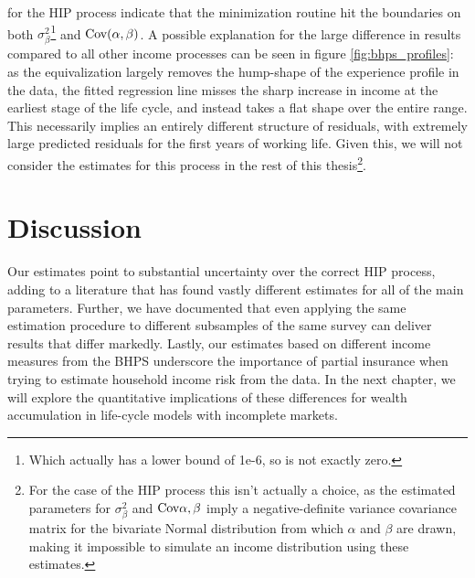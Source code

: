 for the HIP process indicate that the minimization routine hit the boundaries 
on both $\sigma^2_{\beta}$\footnote{Which actually has a lower bound of 1e-6, so 
is not exactly zero.} and $\mbox{Cov}(\alpha,\beta)$. A possible explanation for the 
large difference in results compared to all other income processes can be seen 
in figure \ref{fig:bhps_profiles}: as the equivalization largely removes the
hump-shape of the experience profile in the data, the fitted regression line
misses the sharp increase in income at the earliest stage of the life cycle, and
instead takes a flat shape over the entire range. This necessarily implies an
entirely different structure of residuals, with extremely large predicted residuals
for the first years of working life. Given this, we will not consider the estimates
for this process in the rest of this thesis\footnote{For the case of the HIP process 
this isn't actually a choice, as the estimated parameters for $\sigma^2_{\beta}$ and
$\mbox{Cov}{\alpha,\beta}$ imply a negative-definite variance covariance matrix for the
bivariate Normal distribution from which $\alpha$ and $\beta$ are drawn, making it
impossible to simulate an income distribution using these estimates.}.

\section{Discussion}
Our estimates point to substantial uncertainty over the correct HIP process, 
adding to a literature that has found vastly different estimates for all of the 
main parameters. Further, we have documented that even applying the same estimation
procedure to different subsamples of the same survey can deliver results that
differ markedly. Lastly, our estimates based on different income measures from 
the BHPS underscore the importance of partial insurance when trying to estimate
household income risk from the data. In the next chapter, we will explore the
quantitative implications of these differences for wealth accumulation in 
life-cycle models with incomplete markets.

